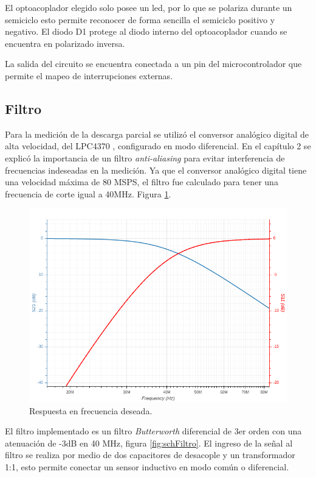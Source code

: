 \vspace{5mm}

El optoacoplador elegido solo posee un led, por lo que se polariza durante un semiciclo esto permite reconocer de forma sencilla el semiciclo positivo y negativo. El diodo D1 protege al diodo interno del optoacoplador cuando se encuentra en polarizado inversa.

La salida del circuito se encuentra conectada a un pin del microcontrolador que permite el mapeo de interrupciones externas.

\vspace{10mm}
\subsection{Filtro}

Para la medición de la descarga parcial se utilizó el conversor analógico digital de alta velocidad, del LPC4370 \citep{micro:lpc4370}, configurado en modo diferencial. En el capítulo 2 se explicó la importancia de un filtro \textit{anti-aliasing} para evitar interferencia de frecuencias indeseadas en la medición. Ya que el conversor analógico digital tiene una velocidad máxima de 80 MSPS, el filtro fue calculado para tener una frecuencia de corte igual a 40MHz. Figura \ref{fig:respFrec}. 

\begin{figure}[ht]
	\centering
	\includegraphics[width=130mm]{./Figures/respFrec.png}
	\caption{Respuesta en frecuencia deseada.}
	\label{fig:respFrec}
\end{figure}


El filtro implementado es un filtro \textit{Butterworth} diferencial de 3er orden con una atenuación de -3dB en 40 MHz, figura \ref{fig:schFiltro}. El ingreso de la señal al filtro se realiza por medio de dos capacitores de desacople y un transformador 1:1, esto permite conectar un sensor inductivo en modo común o diferencial. 


